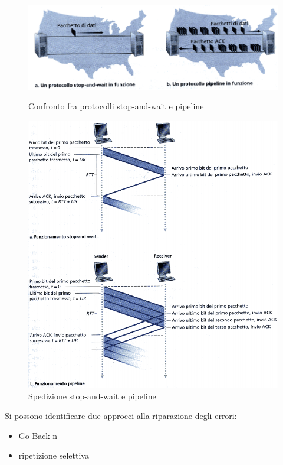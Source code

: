 \documentclass[11pt,a4paper]{article}
\begin{document}
\begin{figure}
	\begin{center}
		\includegraphics[scale=0.6]{img/023.png}
		\caption{Confronto fra protocolli stop-and-wait e pipeline}
		\includegraphics[scale=0.6]{img/024.png}
		\caption{Spedizione stop-and-wait e pipeline}
	\end{center}
\end{figure}
Si possono identificare due approcci alla riparazione degli errori:
\begin{itemize}
	\item Go-Back-n
	\item ripetizione selettiva
\end{itemize}
\end{document}
